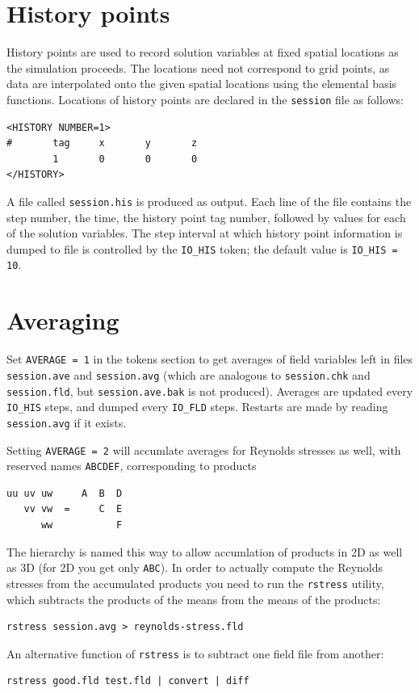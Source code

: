 \documentclass[11pt,a4paper]{report}
\begin{document}
\section{History points}
\label{sec.history}

History points are used to record solution variables at fixed spatial
locations as the simulation proceeds.  The locations need not
correspond to grid points, as data are interpolated onto the given
spatial locations using the elemental basis functions.  Locations of
history points are declared in the \verb+session+ file as follows:
\begin{verbatim}
<HISTORY NUMBER=1>
#       tag     x       y       z 
        1       0       0       0
</HISTORY>
\end{verbatim}

A file called \verb+session.his+ is produced as output.  Each line of
the file contains the step number, the time, the history point tag
number, followed by values for each of the solution variables.  The
step interval at which history point information is dumped to file is
controlled by the \verb+IO_HIS+ token; the default value is
\verb+IO_HIS = 10+.

\section{Averaging}
\label{sec.average}

Set \verb+AVERAGE = 1+ in the tokens section to get averages of field
variables left in files \verb+session.ave+ and \verb+session.avg+
(which are analogous to \verb+session.chk+ and \verb+session.fld+, but
\verb+session.ave.bak+ is not produced).  Averages are updated
every \verb+IO_HIS+ steps, and dumped every \verb+IO_FLD+ steps.
Restarts are made by reading \verb+session.avg+ if it exists.

Setting \verb+AVERAGE = 2+ will accumlate averages for Reynolds
stresses as well, with reserved names \verb+ABCDEF+, corresponding to
products
\begin{verbatim}
uu uv uw     A  B  D
   vv vw  =     C  E
      ww           F
\end{verbatim}
The hierarchy is named this way to allow accumlation of products in 2D
as well as 3D (for 2D you get only \verb+ABC+).  In order to actually
compute the Reynolds stresses from the accumulated products you need
to run the \verb+rstress+ utility, which subtracts the products of the
means from the means of the products:
\begin{verbatim}
rstress session.avg > reynolds-stress.fld
\end{verbatim}
An alternative function of \verb+rstress+ is to subtract one field
file from another:
\begin{verbatim}
rstress good.fld test.fld | convert | diff
\end{verbatim}
\end{document}

